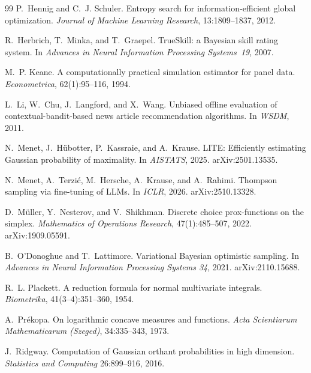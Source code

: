\documentclass[11pt]{article}
\begin{document}
\begin{thebibliography}{99}
 P.~Hennig and
C.~J. Schuler. Entropy search for information-efficient global
optimization. \emph{Journal of Machine Learning Research},
13:1809--1837, 2012.

 R.~Herbrich, T.~Minka, and T.~Graepel.
TrueSkill: a Bayesian skill rating system. In \emph{Advances in
Neural Information Processing Systems~19}, 2007.

 M.~P. Keane. A computationally
practical simulation estimator for panel data. \emph{Econometrica},
62(1):95--116, 1994.

 L.~Li,
W.~Chu, J.~Langford, and X.~Wang. Unbiased offline evaluation of
contextual-bandit-based news article recommendation algorithms. In
\emph{WSDM}, 2011.

 N.~Menet, J.~H\"ubotter, P.~Kassraie, and
A.~Krause. LITE: Efficiently estimating Gaussian probability of
maximality.
In \emph{AISTATS}, 2025. arXiv:2501.13535.

 N.~Menet, A.~Terzi\'c, M.~Hersche, A.~Krause, and
A.~Rahimi. Thompson sampling via fine-tuning of LLMs. In
\emph{ICLR}, 2026. arXiv:2510.13328.

 D.~M\"uller, Y.~Nesterov, and V.~Shikhman.
Discrete choice prox-functions on the simplex. \emph{Mathematics of
Operations Research}, 47(1):485--507, 2022. arXiv:1909.05591.

B.~O'Donoghue and T.~Lattimore. Variational Bayesian optimistic
sampling. In \emph{Advances in Neural Information Processing Systems
34}, 2021. arXiv:2110.15688.

 R.~L. Plackett. A reduction
formula for normal multivariate integrals. \emph{Biometrika},
41(3--4):351--360, 1954.

 A.~Pr\'ekopa. On logarithmic
concave measures and functions. \emph{Acta Scientiarum Mathematicarum
(Szeged)}, 34:335--343, 1973.

 J.~Ridgway. Computation of
Gaussian orthant probabilities in high dimension. \emph{Statistics
and Computing} 26:899--916, 2016.


\end{thebibliography}
\end{document}
